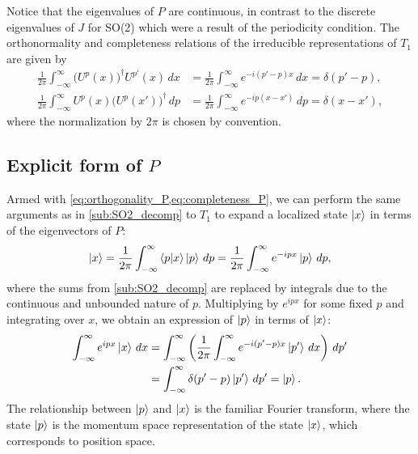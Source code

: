 Notice that the eigenvalues of $P$ are continuous, in contrast to the discrete eigenvalues of $J$ for SO(2) which were a result of the periodicity condition. The orthonormality and completeness relations of the irreducible representations of $T_1$ are given by
\begin{align}
    \frac{1}{2\pi}\int_{-\infty}^{\infty} {\bigl(U^p(x)\bigr)}^\dagger U^{p'}(x) \,dx &= \frac{1}{2\pi}\int_{-\infty}^{\infty} e^{-i(p'-p)x} \,dx = \delta(p'-p) \label{eq:orthogonality_P}, \\
    \frac{1}{2\pi}\int_{-\infty}^{\infty} U^{p}(x){\bigl(U^p(x')\bigr)}^\dagger \,dp &= \frac{1}{2\pi}\int_{-\infty}^{\infty} e^{-ip(x-x')} \,dp = \delta(x-x'), \label{eq:completeness_P}
\end{align}
where the normalization by $2\pi$ is chosen by convention.

\subsection{Explicit form of $P$}\label{sub:explicit_P}

Armed with \cref{eq:orthogonality_P,eq:completeness_P}, we can perform the same arguments as in \cref{sub:SO2_decomp} to $T_1$ to expand a localized state $\ket{x}$ in terms of the eigenvectors of $P$:
\begin{align}
    \ket{x} = \frac{1}{2\pi}\int_{-\infty}^{\infty} \braket{p|x}\ket{p} \,dp = \frac{1}{2\pi}\int_{-\infty}^{\infty} e^{-ipx}\ket{p} \,dp,
\end{align}
where the sums from \cref{sub:SO2_decomp} are replaced by integrals due to the continuous and unbounded nature of $p$. Multiplying by $e^{ipx}$ for some fixed $p$ and integrating over $x$, we obtain an expression of $\ket{p}$ in terms of $\ket{x}$:
\begin{align}
    \begin{split}        
    \int_{-\infty}^{\infty} e^{ipx}\ket{x} \,dx
        &= \int_{-\infty}^{\infty} \left(\frac{1}{2\pi} \int_{-\infty}^{\infty} e^{-i(p'-p)x}\ket{p'} \,dx \right)\,dp' \\
        &= \int_{-\infty}^{\infty} \delta(p'-p) \ket{p'} \,dp' = \ket{p}.
    \end{split}
\end{align}
The relationship between $\ket{p}$ and $\ket{x}$ is the familiar Fourier transform, where the state $\ket{p}$ is the momentum space representation of the state $\ket{x}$, which corresponds to position space.

